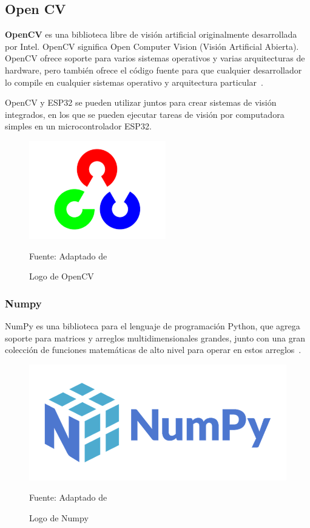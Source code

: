 \subsection{Open CV}

\textbf{OpenCV} es una biblioteca libre de visión artificial originalmente desarrollada por Intel. OpenCV significa Open Computer Vision (Visión Artificial Abierta). OpenCV ofrece soporte para varios sistemas operativos y varias arquitecturas de hardware, pero también ofrece el código fuente para que cualquier desarrollador lo compile en cualquier sistemas operativo y arquitectura particular~\cite{opencv}. 

OpenCV y ESP32 se pueden utilizar juntos para crear sistemas de visión integrados, en los que se pueden ejecutar tareas de visión por computadora simples en un microcontrolador ESP32.

\begin{figure}[htb]
	\centering
	\includegraphics[scale  = 0.80]{Imagenes/opencv.png}
	\caption{Logo de OpenCV}{Fuente: Adaptado de~\cite{opencv}}

\end{figure}

\subsubsection{Numpy}

NumPy es una biblioteca para el lenguaje de programación Python, que agrega soporte para matrices y arreglos multidimensionales grandes, junto con una gran colección de funciones matemáticas de alto nivel para operar en estos arreglos~\cite{numpy}.

\begin{figure}[htb]
	\centering
	\includegraphics[scale  = 0.80]{Imagenes/numpy.png}
	\caption{Logo de Numpy}{Fuente: Adaptado de~\cite{numpy}}
\end{figure}

